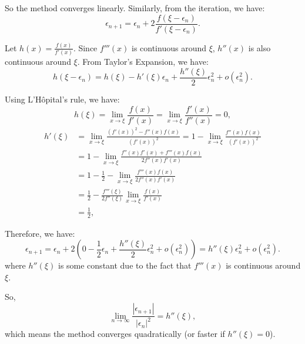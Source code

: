 \documentclass[
  course = {{16-811 Math Fundamentals for Robotics}},
  quartile = {{1}},
  assignment = 2,
  name = {{Kangle Deng}},
  email = {{kangled@andrew.cmu.edu}},
  firstexercise = 1
]{aga-homework}
\begin{document}
So the method converges linearly.
\subexercise
Similarly, from the iteration, we have:
\begin{equation*}
    \epsilon_{n+1} = \epsilon_n + 2\frac{f(\xi - \epsilon_n)}{f'(\xi - \epsilon_n)}.
\end{equation*}

Let $h(x) = \frac{f(x)}{f'(x)}$. Since $f'''(x)$ is continuous around $\xi$, $h''(x)$ is also continuous around $\xi$. From Taylor's Expansion, we have:
\begin{equation*}
    h(\xi - \epsilon_n) = h(\xi) - h'(\xi)\epsilon_n + \frac{h''(\xi)}{2}\epsilon_n^2 + o(\epsilon_n^2).
\end{equation*}

Using L'Hôpital's rule, we have:
\begin{equation*}
    h(\xi) = \lim \limits_{x \rightarrow \xi} \frac{f(x)}{f'(x)} = \lim \limits_{x \rightarrow \xi} \frac{f'(x)}{f''(x)} = 0,
\end{equation*}
\begin{equation*}
\begin{aligned}
    h'(\xi) & = \lim \limits_{x \rightarrow \xi} \frac{(f'(x))^2 - f''(x)f(x)}{(f'(x))^2} =1 - \lim \limits_{x \rightarrow \xi} \frac{f''(x)f(x)}{(f'(x))^2} \\ 
    & = 1 - \lim \limits_{x \rightarrow \xi} \frac{f''(x)f'(x) + f'''(x)f(x)}{2f''(x)f'(x)} \\
    & = 1 - \frac{1}{2} - \lim \limits_{x \rightarrow \xi} \frac{f'''(x)f(x)}{2f''(x)f'(x)} \\
    & = \frac{1}{2} - \frac{f'''(\xi)}{2f''(\xi)} \lim \limits_{x \rightarrow \xi} \frac{f(x)}{f'(x)} \\
    & = \frac{1}{2},
\end{aligned}
\end{equation*}

Therefore, we have:
\begin{equation*}
    \epsilon_{n+1} = \epsilon_n + 2(0 - \frac{1}{2}\epsilon_n + \frac{h''(\xi)}{2}\epsilon_n^2 + o(\epsilon_n^2)) = h''(\xi)\epsilon_n^2 + o(\epsilon_n^2).
\end{equation*}
where $h''(\xi)$ is some constant due to the fact that $f'''(x)$ is continuous around $\xi$.

So,
\begin{equation*}
    \lim \limits_{n \rightarrow \infty} \frac{|\epsilon_{n+1}|}{|\epsilon_n|^2} = h''(\xi),
\end{equation*}
which means the method converges quadratically (or faster if $h''(\xi) = 0$).
\end{document}
